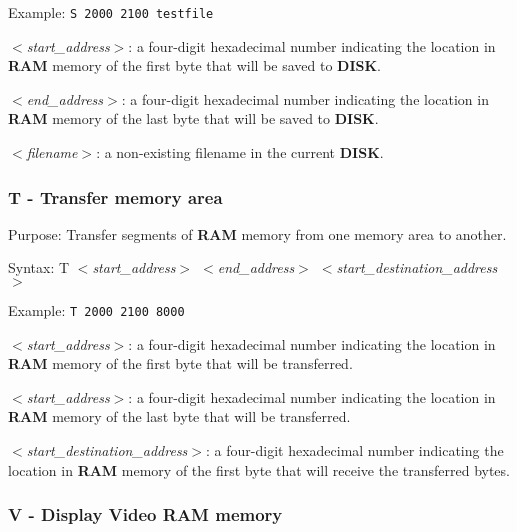         Example: \texttt{S 2000 2100 testfile}

        \hspace{1cm}\textit{$<$start\_address$>$}: a four-digit hexadecimal
        number indicating the location in \textbf{RAM} memory of the first byte
        that will be saved to \textbf{DISK}.

        \hspace{1cm}\textit{$<$end\_address$>$}: a four-digit hexadecimal
        number indicating the location in \textbf{RAM} memory of the last byte
        that will be saved to \textbf{DISK}.

        \hspace{1cm}\textit{$<$filename$>$}: a non-existing filename in the
        current \textbf{DISK}.

        \subsubsection{T - Transfer memory area}

        Purpose: Transfer segments of \textbf{RAM} memory from one memory area
        to another.

        Syntax: T \textit{$<$start\_address$>$ $<$end\_address$>$
        $<$start\_destination\_address$>$}

        Example: \texttt{T 2000 2100 8000}

        \hspace{1cm}\textit{$<$start\_address$>$}: a four-digit hexadecimal
        number indicating the location in \textbf{RAM} memory of the first byte
        that will be transferred.

        \hspace{1cm}\textit{$<$start\_address$>$}: a four-digit hexadecimal
        number indicating the location in \textbf{RAM} memory of the last byte
        that will be transferred.

        \hspace{1cm}\textit{$<$start\_destination\_address$>$}: a four-digit
        hexadecimal number indicating the location in \textbf{RAM} memory of the
        first byte that will receive the transferred bytes.

        \subsubsection{V - Display Video RAM memory}

